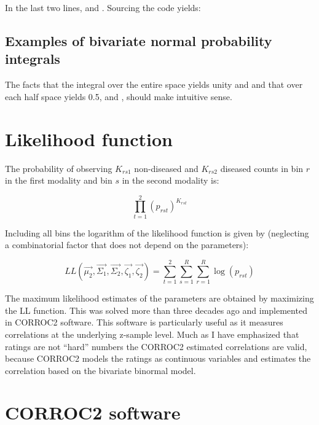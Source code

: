 \documentclass[
]{book}
\begin{document}
In the last two lines, and . Sourcing the code yields:

\hypertarget{bivariate-binormal-model-examples-integrals}{%
\subsection{Examples of bivariate normal probability integrals}\label{bivariate-binormal-model-examples-integrals}}

The facts that the integral over the entire space yields unity and and that over each half space yields 0.5, and , should make intuitive sense.

\hypertarget{bivariate-binormal-model-likelihood}{%
\section{Likelihood function}\label{bivariate-binormal-model-likelihood}}

The probability of observing \(K_{rs1}\) non-diseased and \(K_{rs2}\) diseased counts in bin \(r\) in the first modality and bin \(s\) in the second modality is:

\begin{equation} 
\prod_{t=1}^{2}\left ( p_{rst} \right )^{K_{rst}}
\end{equation}

Including all bins the logarithm of the likelihood function is given by (neglecting a combinatorial factor that does not depend on the parameters):

\begin{equation} 
LL\left ( \overrightarrow{\mu_2},\overrightarrow{\Sigma_1},\overrightarrow{\Sigma_2},\overrightarrow{\zeta_1},\overrightarrow{\zeta_2} \right ) = \sum_{t=1}^{2}\sum_{s=1}^{R}\sum_{r=1}^{R} \log(p_{rst})
\end{equation}

The maximum likelihood estimates of the parameters are obtained by maximizing the LL function. This was solved \citep[\citet{metz1984new}]{metz1980statistical} more than three decades ago and implemented in CORROC2 software. This software is particularly useful as it measures correlations at the underlying z-sample level. Much as I have emphasized that ratings are not ``hard'' numbers the CORROC2 estimated correlations are valid, because CORROC2 models the ratings as continuous variables and estimates the correlation based on the bivariate binormal model.

\hypertarget{bivariate-binormal-model-corroc2}{%
\section{CORROC2 software}\label{bivariate-binormal-model-corroc2}}
\end{document}
